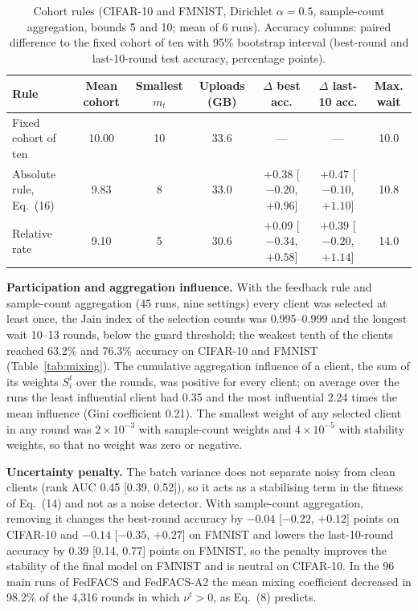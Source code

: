 \documentclass[pdflatex,sn-mathphys-num,oneside]{sn-jnl}%
\theoremstyle{thmstyleone}%
\theoremstyle{thmstyletwo}%
\theoremstyle{thmstylethree}%
\newlength{\journalfloatwidth}
\begin{document}
\begin{table}[!htbp]
\centering
\footnotesize
\setlength{\tabcolsep}{3pt}
\renewcommand{\arraystretch}{1.08}
\caption{Cohort rules (CIFAR-10 and FMNIST, Dirichlet $\alpha=0.5$, sample-count aggregation, bounds 5 and 10; mean of 6 runs). Accuracy columns: paired difference to the fixed cohort of ten with 95\% bootstrap interval (best-round and last-10-round test accuracy, percentage points).}
\label{tab:cohort}
\begin{tabular*}{\journalfloatwidth}{@{\extracolsep{\fill}}lcccccc@{}}
\toprule
Rule & Mean cohort & Smallest $m_t$ & Uploads (GB) & $\Delta$ best acc. & $\Delta$ last-10 acc. & Max. wait \\
\midrule
Fixed cohort of ten & 10.00 & 10 & 33.6 & --- & --- & 10.0 \\
Absolute rule, Eq.~(16) & 9.83 & 8 & 33.0 & $+0.38$ [$-0.20$, $+0.96$] & $+0.47$ [$-0.10$, $+1.10$] & 10.8 \\
Relative rate & 9.10 & 5 & 30.6 & $+0.09$ [$-0.34$, $+0.58$] & $+0.39$ [$-0.20$, $+1.14$] & 14.0 \\
\bottomrule
\end{tabular*}
\end{table}

\textbf{Participation and aggregation influence.} With the feedback rule and sample-count aggregation (45 runs, nine settings) every client was selected at least once, the Jain index of the selection counts was 0.995--0.999 and the longest wait 10--13 rounds, below the guard threshold; the weakest tenth of the clients reached 63.2\% and 76.3\% accuracy on CIFAR-10 and FMNIST (Table~\ref{tab:mixing}). The cumulative aggregation influence of a client, the sum of its weights $S_i^t$ over the rounds, was positive for every client; on average over the runs the least influential client had 0.35 and the most influential 2.24 times the mean influence (Gini coefficient 0.21). The smallest weight of any selected client in any round was $2\times10^{-3}$ with sample-count weights and $4\times10^{-5}$ with stability weights, so that no weight was zero or negative.

\textbf{Uncertainty penalty.} The batch variance does not separate noisy from clean clients (rank AUC 0.45 [0.39, 0.52]), so it acts as a stabilising term in the fitness of Eq.~(14) and not as a noise detector. With sample-count aggregation, removing it changes the best-round accuracy by $-0.04$ [$-0.22$, $+0.12$] points on CIFAR-10 and $-0.14$ [$-0.35$, $+0.27$] on FMNIST and lowers the last-10-round accuracy by 0.39 [0.14, 0.77] points on FMNIST, so the penalty improves the stability of the final model on FMNIST and is neutral on CIFAR-10. In the 96 main runs of FedFACS and FedFACS-A2 the mean mixing coefficient decreased in 98.2\% of the 4,316 rounds in which $\nu^t>0$, as Eq.~(8) predicts.
\end{document}
